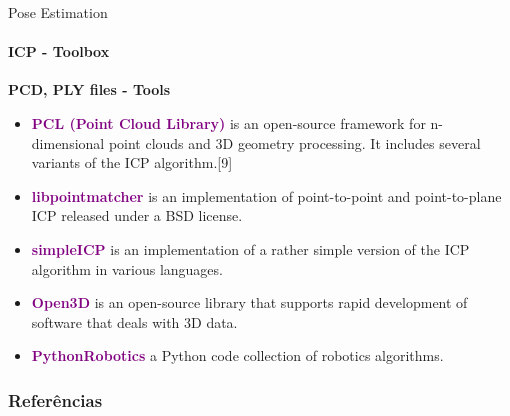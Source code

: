 \documentclass[aspectratio=169]{beamer}
\begin{document}
\begin{frame}[fragile, t]{Pose Estimation}
	\framesubtitle{ICP - Toolbox}

	\textbf{PCD, PLY files - Tools}
	\begin{itemize}
		\item \textcolor{purple}{\textbf{PCL (Point Cloud Library)}} is an open-source framework for n-dimensional point clouds and 3D geometry processing. It includes several variants of the ICP algorithm.[9]
		\item \textcolor{purple}{\textbf{libpointmatcher}} is an implementation of point-to-point and point-to-plane ICP released under a BSD license.
		\item \textcolor{purple}{\textbf{simpleICP}} is an implementation of a rather simple version of the ICP algorithm in various languages.
		\item \textcolor{purple}{\textbf{Open3D}} is an open-source library that supports rapid development of software that deals with 3D data. 
		\item \textcolor{purple}{\textbf{PythonRobotics}} a Python code collection of robotics algorithms.
	\end{itemize}

\end{frame}

 
\begin{frame}[t, allowframebreaks]
	\frametitle{Referências}
	
\end{frame}
\end{document}
